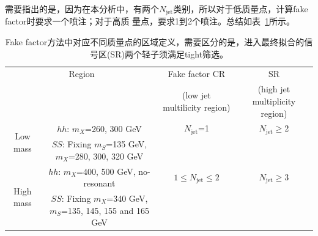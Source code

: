 \begin{table}[!ht]
\begin{center}
\caption{tight与anti-tight $\mu$子定义，两者都应通过轻子baseline筛选。}
\label{tab:tight_mu_def}
\end{center}
\end{table}
需要指出的是，因为在本分析中，有两个$N_{\text{jet}}$类别，所以对于低质量点，计算fake factor时要求一个喷注；对于高质
量点，要求1到2个喷注。总结如表~\ref{tab:summary_CRs_ff}所示。
\begin{table}[!ht]
\begin{center}
\scriptsize
\begin{tabular}{cc|c|c}
\hline
\multicolumn{2}{c|}{Region}  &Fake factor CR &SR   \\
                      			&    &(low jet multilicity region)  &(high jet multiplicity region) \\
\hline
\multirow{2}{*}{Low mass} &$hh$: $m_X$=260, 300 GeV  &$N_{\text{jet}}$=1    &$N_{\text{jet}} \geq$2 \\
                          &$SS$: Fixing $m_S$=135 GeV, $m_X$=280, 300, 320 GeV  &  & \\
\hline
\multirow{2}{*}{High mass} &$hh$: $m_X$=400, 500 GeV, no-resonant  &$1\leq N_{\text{jet}} \leq 2$    &$N_{\text{jet}} \geq$3 \\
                          &$SS$: Fixing $m_X$=340 GeV, $m_S$=135, 145, 155 and 165 GeV  &  & \\

\hline
\end{tabular}
\caption{Fake factor方法中对应不同质量点的区域定义，需要区分的是，进入最终拟合的信号区(SR)两个轻子须满足tight筛选。}
\label{tab:summary_CRs_ff}
\end{center}
\end{table}
